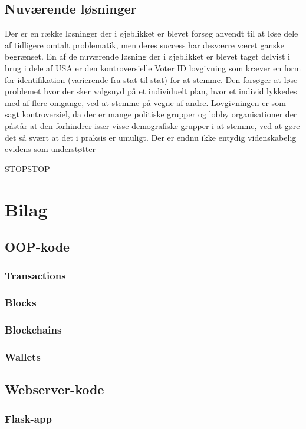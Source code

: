 \documentclass[a4paper, 8pt, oneside]{article} %
\begin{document}
\subsection{Nuværende løsninger}
Der er en række løsninger der i øjeblikket er blevet forsøg anvendt til at løse dele af tidligere omtalt problematik, men deres success har desværre været ganske begrænset. En af de nuværende løsning der i øjeblikket er blevet taget delvist i brug i dele af USA er den kontroversielle Voter ID lovgivning som kræver en form for identifikation (varierende fra stat til stat) for at stemme. Den forsøger at løse problemet hvor der sker valgsnyd på et individuelt plan, hvor et individ lykkedes med af flere omgange, ved at stemme på vegne af andre. Lovgivningen er som sagt kontroversiel, da der er mange politiske grupper og lobby organisationer der påstår at den forhindrer især visse demografiske grupper i at stemme, ved at gøre det så svært at det i praksis er umuligt. Der er endnu ikke entydig videnskabelig evidens som understøtter 

STOPSTOP

\newpage
\appendix
\section{Bilag}
\subsection{OOP-kode}
\subsubsection{Transactions}

\subsubsection{Blocks}

\subsubsection{Blockchains}

\subsubsection{Wallets}

\subsection{Webserver-kode}
\subsubsection{Flask-app}


\newpage
\printbibliography
\end{document}

